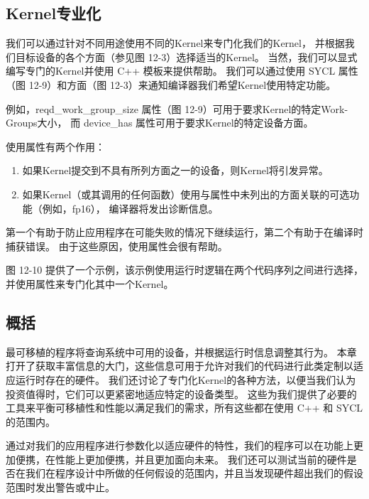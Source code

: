 \subsection{Kernel专业化}
我们可以通过针对不同用途使用不同的Kernel来专门化我们的Kernel，
并根据我们目标设备的各个方面（参见图 12-3）选择适当的Kernel。 
当然，我们可以显式编写专门的Kernel并使用 C++ 模板来提供帮助。 
我们可以通过使用 SYCL 属性（图 12-9）和方面（图 12-3）来通知编译器我们希望Kernel使用特定功能。

例如，reqd\_work\_group\_size 属性（图 12-9）可用于要求Kernel的特定Work-Groups大小，
而 device\_has 属性可用于要求Kernel的特定设备方面。

使用属性有两个作用：

\begin{enumerate}
	\item 如果Kernel提交到不具有所列方面之一的设备，则Kernel将引发异常。

	\item 如果Kernel（或其调用的任何函数）使用与属性中未列出的方面关联的可选功能（例如，fp16），
	编译器将发出诊断信息。
\end{enumerate}

第一个有助于防止应用程序在可能失败的情况下继续运行，第二个有助于在编译时捕获错误。 
由于这些原因，使用属性会很有帮助。

图 12-10 提供了一个示例，该示例使用运行时逻辑在两个代码序列之间进行选择，并使用属性来专门化其中一个Kernel。

\subsection{概括}
最可移植的程序将查询系统中可用的设备，并根据运行时信息调整其行为。 
本章打开了获取丰富信息的大门，这些信息可用于允许对我们的代码进行此类定制以适应运行时存在的硬件。 
我们还讨论了专门化Kernel的各种方法，以便当我们认为投资值得时，它们可以更紧密地适应特定的设备类型。 
这些为我们提供了必要的工具来平衡可移植性和性能以满足我们的需求，所有这些都在使用 C++ 和 SYCL 的范围内。

通过对我们的应用程序进行参数化以适应硬件的特性，我们的程序可以在功能上更加便携，在性能上更加便携，并且更加面向未来。 
我们还可以测试当前的硬件是否在我们在程序设计中所做的任何假设的范围内，并且当发现硬件超出我们的假设范围时发出警告或中止。